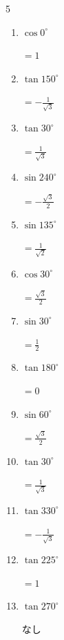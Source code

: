 \begin{multicols}{5}
\begin{enumerate}
  \item $\displaystyle \cos{0^\circ}$

        $\displaystyle =1$

  \item $\displaystyle \tan{150^\circ}$

        $\displaystyle =-\frac{1}{\sqrt{3}}$

  \item $\displaystyle \tan{30^\circ}$

        $\displaystyle =\frac{1}{\sqrt{3}}$

  \item $\displaystyle \sin{240^\circ}$

        $\displaystyle =-\frac{\sqrt{3}}{2}$

  \item $\displaystyle \sin{135^\circ}$

        $\displaystyle =\frac{1}{\sqrt{2}}$

  \item $\displaystyle \cos{30^\circ}$

        $\displaystyle =\frac{\sqrt{3}}{2}$

  \item $\displaystyle \sin{30^\circ}$

        $\displaystyle =\frac{1}{2}$

  \item $\displaystyle \tan{180^\circ}$

        $\displaystyle =0$

  \item $\displaystyle \sin{60^\circ}$

        $\displaystyle =\frac{\sqrt{3}}{2}$

  \item $\displaystyle \tan{30^\circ}$

        $\displaystyle =\frac{1}{\sqrt{3}}$

  \item $\displaystyle \tan{330^\circ}$

        $\displaystyle =-\frac{1}{\sqrt{3}}$

  \item $\displaystyle \tan{225^\circ}$

        $\displaystyle =1$

  \item $\displaystyle \tan{270^\circ}$

        $\displaystyle なし$


\end{enumerate}
\end{multicols}
